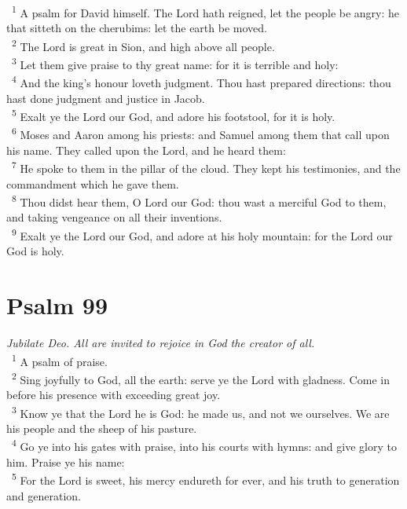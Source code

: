 \documentclass[a5paper,12pt]{article}
\begin{document}
\begin{multicols*}{2}
~\textsuperscript{1} A psalm for David himself. The Lord hath reigned, let the people be angry: he that sitteth on the cherubims: let the earth be moved.\\
~\textsuperscript{2} The Lord is great in Sion, and high above all people.\\
~\textsuperscript{3} Let them give praise to thy great name: for it is terrible and holy:\\
~\textsuperscript{4} And the king's honour loveth judgment. Thou hast prepared directions: thou hast done judgment and justice in Jacob.\\
~\textsuperscript{5} Exalt ye the Lord our God, and adore his footstool, for it is holy.\\
~\textsuperscript{6} Moses and Aaron among his priests: and Samuel among them that call upon his name. They called upon the Lord, and he heard them:\\
~\textsuperscript{7} He spoke to them in the pillar of the cloud. They kept his testimonies, and the commandment which he gave them.\\
~\textsuperscript{8} Thou didst hear them, O Lord our God: thou wast a merciful God to them, and taking vengeance on all their inventions.\\
~\textsuperscript{9} Exalt ye the Lord our God, and adore at his holy mountain: for the Lord our God is holy.\\

\section{Psalm 99}
\label{sec:org52f01e1}
\emph{Jubilate Deo. All are invited to rejoice in God the creator of all.}\\

~\textsuperscript{1} A psalm of praise.\\
~\textsuperscript{2} Sing joyfully to God, all the earth: serve ye the Lord with gladness. Come in before his presence with exceeding great joy.\\
~\textsuperscript{3} Know ye that the Lord he is God: he made us, and not we ourselves. We are his people and the sheep of his pasture.\\
~\textsuperscript{4} Go ye into his gates with praise, into his courts with hymns: and give glory to him. Praise ye his name:\\
~\textsuperscript{5} For the Lord is sweet, his mercy endureth for ever, and his truth to generation and generation.\\


\end{multicols*}
\end{document}
